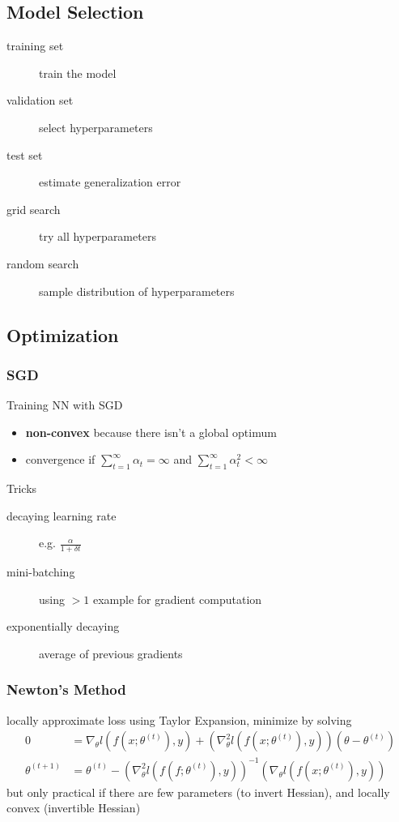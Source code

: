 \documentclass[]{article}
\begin{document}
\subsection{Model Selection}%
\label{sub:model_selection}

\begin{description}
    \item[training set] train the model
    \item[validation set] select hyperparameters
    \item[test set] estimate generalization error
    \item[grid search] try all hyperparameters
    \item[random search] sample distribution of hyperparameters
\end{description}

\subsection{Optimization}%
\label{sub:optimization}

\subsubsection{SGD}%
\label{ssub:sgd}

Training NN with SGD
\begin{itemize}
    \item \textbf{non-convex} because there isn't a global optimum
    \item convergence if $\sum_{t=1}^\infty \alpha_t = \infty$ and $\sum_{t=1}^\infty \alpha_t^2 < \infty$
\end{itemize}
Tricks
\begin{description}
    \item[decaying learning rate] e.g. $ \frac{\alpha}{1 + \delta t}$
    \item[mini-batching] using $>1$ example for gradient computation
    \item[exponentially decaying] average of previous gradients
\end{description}

\subsubsection{Newton's Method}%
\label{ssub:newton_s_method}
locally approximate loss using Taylor Expansion, minimize by solving
\begin{align*}
    0 &= \nabla_\theta l(f(x;\theta^{(t)}),y) + (\nabla^2_\theta l(f(x;\theta^{(t)}),y)) ( \theta - \theta^{(t)}) \\
    \theta^{(t+1)} &= \theta^{(t)} - (\nabla^2_\theta l(f(f;\theta^{(t)}),y))^{-1} (\nabla_\theta l(f(x;\theta^{(t)}),y))
\end{align*}
but only practical if there are few parameters (to invert Hessian), and locally convex (invertible Hessian)
\end{document}
